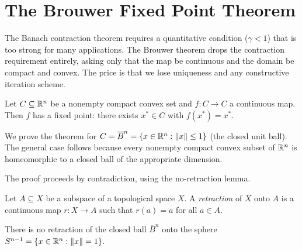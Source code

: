 \documentclass[11pt,a4paper]{article}
\begin{document}

\section{The Brouwer Fixed Point Theorem}
\label{sec:brouwer}

The Banach contraction theorem requires a quantitative condition
($\gamma < 1$) that is too strong for many applications.  The Brouwer
theorem drops the contraction requirement entirely, asking only that
the map be continuous and the domain be compact and convex.  The price
is that we lose uniqueness and any constructive iteration scheme.

\begin{theorem}
\label{thm:brouwer}
Let $C \subseteq \mathbb{R}^n$ be a nonempty compact convex set and
$f \colon C \to C$ a continuous map.  Then $f$ has a fixed point:
there exists $x^* \in C$ with $f(x^*) = x^*$.
\end{theorem}

We prove the theorem for $C = \overline{B}^n = \{x \in \mathbb{R}^n :
\|x\| \leq 1\}$ (the closed unit ball).  The general case follows
because every nonempty compact convex subset of $\mathbb{R}^n$ is
homeomorphic to a closed ball of the appropriate dimension.

The proof proceeds by contradiction, using the no-retraction lemma.

\begin{definition}[Retraction]
\label{def:retraction}
Let $A \subseteq X$ be a subspace of a topological space $X$.  A
\emph{retraction} of $X$ onto $A$ is a continuous map
$r \colon X \to A$ such that $r(a) = a$ for all $a \in A$.
\end{definition}

\begin{lemma}
\label{lem:no-retraction}
There is no retraction of the closed ball $\overline{B}^n$ onto the
sphere $S^{n-1} = \{x \in \mathbb{R}^n : \|x\| = 1\}$.
\end{lemma}
\end{document}
